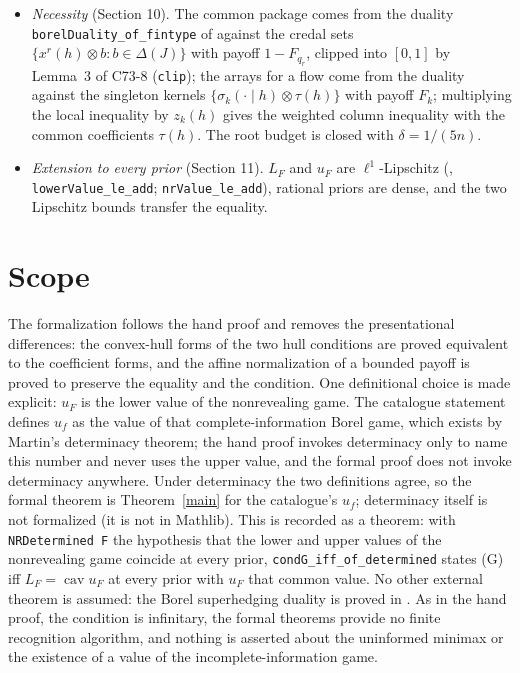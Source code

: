 \documentclass[11pt]{article}
\theoremstyle{definition}
\begin{document}
\begin{itemize}
\item \emph{Necessity} (Section 10). The common package comes from the duality \texttt{borelDuality\_of\_fintype} of \cite{Lean8} against the credal sets $\{x^r(h)\otimes b:b\in\Delta(J)\}$ with payoff $1-F_{q_r}$, clipped into $[0,1]$ by Lemma~3 of C73-8 (\texttt{clip}); the arrays for a flow come from the duality against the singleton kernels $\{\sigma_k(\cdot\mid h)\otimes\tau(h)\}$ with payoff $F_k$; multiplying the local inequality by $z_k(h)$ gives the weighted column inequality with the common coefficients $\tau(h)$. The root budget is closed with $\delta=1/(5n)$.
\item \emph{Extension to every prior} (Section 11). $L_F$ and $u_F$ are $\ell^1$-Lipschitz (\cite{Lean8}, \texttt{lowerValue\_le\_add}; \texttt{nrValue\_le\_add}), rational priors are dense, and the two Lipschitz bounds transfer the equality.
\end{itemize}

\section{Scope}

The formalization follows the hand proof and removes the presentational differences: the convex-hull forms of the two hull conditions are proved equivalent to the coefficient forms, and the affine normalization of a bounded payoff is proved to preserve the equality and the condition. One definitional choice is made explicit: $u_F$ is the lower value of the nonrevealing game. The catalogue statement defines $u_f$ as the value of that complete-information Borel game, which exists by Martin's determinacy theorem; the hand proof invokes determinacy only to name this number and never uses the upper value, and the formal proof does not invoke determinacy anywhere. Under determinacy the two definitions agree, so the formal theorem is Theorem~\ref{main} for the catalogue's $u_f$; determinacy itself is not formalized (it is not in Mathlib). This is recorded as a theorem: with \texttt{NRDetermined F} the hypothesis that the lower and upper values of the nonrevealing game coincide at every prior, \texttt{condG\_iff\_of\_determined} states (G) iff $L_F=\operatorname{cav}u_F$ at every prior with $u_F$ that common value. No other external theorem is assumed: the Borel superhedging duality is proved in \cite{Lean8}. As in the hand proof, the condition is infinitary, the formal theorems provide no finite recognition algorithm, and nothing is asserted about the uninformed minimax or the existence of a value of the incomplete-information game.
\end{document}
